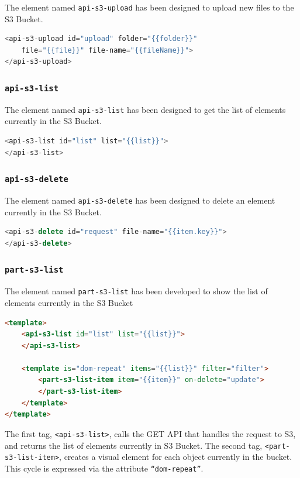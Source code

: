 The element named \texttt{api-s3-upload} has been designed to upload new files to the S3 Bucket.
\begin{lstlisting}[language=javascript]
<api-s3-upload id="upload" folder="{{folder}}"
	file="{{file}}" file-name="{{fileName}}">
</api-s3-upload>
\end{lstlisting}


\subsubsection{\texttt{api-s3-list}}
\label{api-s3-list}
The element named \texttt{api-s3-list} has been designed to get the list of elements currently in the S3 Bucket.
\begin{lstlisting}[language=javascript]
<api-s3-list id="list" list="{{list}}">
</api-s3-list>
\end{lstlisting}


\subsubsection{\texttt{api-s3-delete}}
\label{api-s3-delete}
The element named \texttt{api-s3-delete} has been designed to delete an element currently in the S3 Bucket.
\begin{lstlisting}[language=javascript]
<api-s3-delete id="request" file-name="{{item.key}}">
</api-s3-delete>
\end{lstlisting}


\subsubsection{\texttt{part-s3-list}}
\label{part-s3-list}
The element named \texttt{part-s3-list} has been developed to show the list of elements currently in the S3 Bucket
\begin{lstlisting}[language=html]
<template>
    <api-s3-list id="list" list="{{list}}">
    </api-s3-list>

    <template is="dom-repeat" items="{{list}}" filter="filter">
        <part-s3-list-item item="{{item}}" on-delete="update">
        </part-s3-list-item>
    </template>
</template>
\end{lstlisting}
The first tag, \texttt{<api-s3-list>}, calls the GET API that handles the request to S3, and returns the list of elements currently in S3 Bucket.
The second tag, \texttt{<part-s3-list-item>}, creates a visual element for each object currently in the bucket. This cycle is expressed via the attribute \texttt{``dom-repeat''}.


